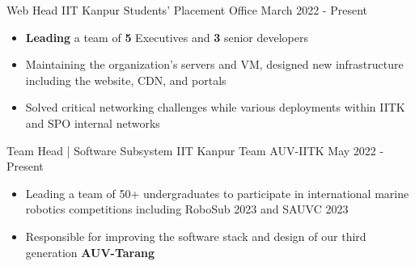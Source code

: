 
\cventry
{Web Head} %
{IIT Kanpur} %
{Students' Placement Office} %
{March 2022 - Present} %
{
  \begin{itemize} %
    \item \textbf{Leading} a team of \textbf{5} Executives and \textbf{3} senior developers
    \item Maintaining the organization’s servers and VM, designed new infrastructure including the website, CDN, and portals
    \item Solved critical networking challenges while various deployments within IITK and SPO internal networks
  \end{itemize}
}

\cventry
{Team Head | Software Subsystem} %
{IIT Kanpur} %
{Team AUV-IITK} %
{May 2022 - Present} %
{
  \begin{itemize} %
    \item Leading a team of 50+ undergraduates to participate in international marine robotics competitions including RoboSub 2023 and SAUVC 2023
    \item Responsible for improving the software stack and design of our third generation \textbf{AUV-Tarang}
  \end{itemize}
}

